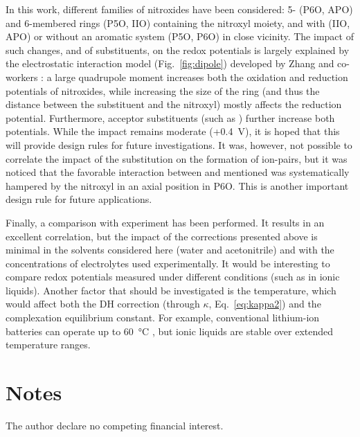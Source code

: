 \documentclass[review,preprint]{elsarticle}
\begin{document}
In this work, different families of nitroxides have been considered: 5- (P6O, APO) and 6-membered rings (P5O, IIO) containing the nitroxyl moiety, and with (IIO, APO) or without an aromatic system (P5O, P6O) in close vicinity. The impact of such changes, and of substituents, on the redox potentials is largely explained by the electrostatic interaction model (Fig.~\ref{fig:dipole}) developed by Zhang and co-workers \cite{zhangEffectHeteroatomFunctionality2018}: a large quadrupole moment increases both the oxidation and reduction potentials of nitroxides, while increasing the size of the ring (and thus the distance between the substituent and the nitroxyl) mostly affects the reduction potential. Furthermore, acceptor substituents (such as ) further increase both potentials. While the impact remains moderate (+\SI{0.4}{\volt}), it is hoped that this will provide design rules for future investigations. It was, however, not possible to correlate the impact of the substitution on the formation of ion-pairs, but it was noticed that the favorable interaction between  and  mentioned was systematically hampered by the nitroxyl in an axial position in P6O. This is another important design rule for future applications.

Finally, a comparison with experiment has been performed. It results in an excellent correlation, but the impact of the corrections presented above is minimal in the solvents considered here (water and acetonitrile) and with the concentrations of electrolytes used experimentally. It would be interesting to compare redox potentials measured under different conditions (such as in ionic liquids). Another factor that should be investigated is the temperature, which would affect both the DH correction (through $\kappa$, Eq.~\eqref{eq:kappa2}) and the complexation equilibrium constant. For example, conventional lithium-ion batteries can operate up to \SI{60}{\degreeCelsius} \cite{maTemperatureEffectThermal2018}, but ionic liquids are stable over extended temperature ranges.
	
\section*{Notes}
The author declare no competing financial interest.
\end{document}

